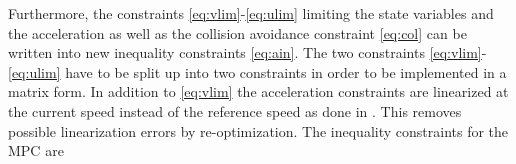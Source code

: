 \documentclass[letterpaper,10pt,conference]{ieeeconf}
\begin{document}

Furthermore, the constraints \eqref{eq:vlim}-\eqref{eq:ulim} limiting the state variables and the acceleration as well as the collision avoidance constraint \eqref{eq:col} can be written into new inequality constraints \eqref{eq:ain}. The two constraints \eqref{eq:vlim}-\eqref{eq:ulim} have to be split up into two constraints in order to be implemented in a matrix form. In addition to \eqref{eq:vlim} the acceleration constraints are linearized at the current speed instead of the reference speed as done in \cite{nikolce}. This removes possible linearization errors by re-optimization. The inequality constraints for the MPC are
\end{document}
